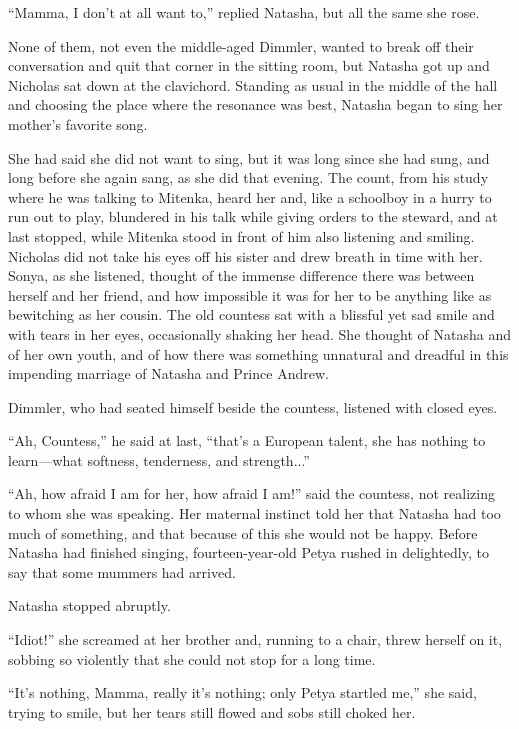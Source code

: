 ``Mamma, I don't at all want to,'' replied Natasha, but all the
same she rose.

None of them, not even the middle-aged Dimmler, wanted to break
off their conversation and quit that corner in the sitting room,
but Natasha got up and Nicholas sat down at the
clavichord. Standing as usual in the middle of the hall and
choosing the place where the resonance was best, Natasha began to
sing her mother's favorite song.

She had said she did not want to sing, but it was long since she
had sung, and long before she again sang, as she did that
evening. The count, from his study where he was talking to
Mitenka, heard her and, like a schoolboy in a hurry to run out to
play, blundered in his talk while giving orders to the steward,
and at last stopped, while Mitenka stood in front of him also
listening and smiling. Nicholas did not take his eyes off his
sister and drew breath in time with her. Sonya, as she listened,
thought of the immense difference there was between herself and
her friend, and how impossible it was for her to be anything like
as bewitching as her cousin. The old countess sat with a blissful
yet sad smile and with tears in her eyes, occasionally shaking
her head. She thought of Natasha and of her own youth, and of how
there was something unnatural and dreadful in this impending
marriage of Natasha and Prince Andrew.

Dimmler, who had seated himself beside the countess, listened
with closed eyes.

``Ah, Countess,'' he said at last, ``that's a European talent,
she has nothing to learn---what softness, tenderness, and
strength...''

``Ah, how afraid I am for her, how afraid I am!'' said the
countess, not realizing to whom she was speaking. Her maternal
instinct told her that Natasha had too much of something, and
that because of this she would not be happy. Before Natasha had
finished singing, fourteen-year-old Petya rushed in delightedly,
to say that some mummers had arrived.

Natasha stopped abruptly.

``Idiot!'' she screamed at her brother and, running to a chair,
threw herself on it, sobbing so violently that she could not stop
for a long time.

``It's nothing, Mamma, really it's nothing; only Petya startled
me,'' she said, trying to smile, but her tears still flowed and
sobs still choked her.

